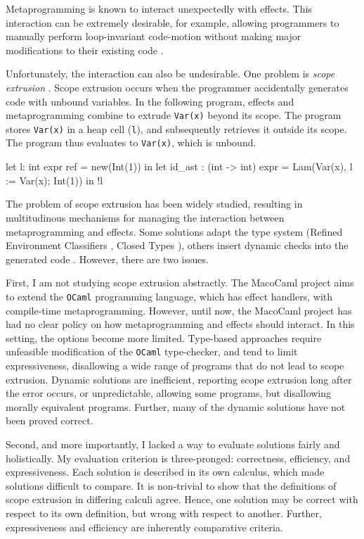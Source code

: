 Metaprogramming is known to interact unexpectedly with effects. This interaction can be extremely desirable, for example, allowing programmers to manually perform loop-invariant code-motion \citep{kiselyov-14} without making major modifications to their existing code \citep{lawall-94}. 

Unfortunately, the interaction can also be undesirable. One problem is \textit{scope extrusion} \citep{kiselyov-14}. Scope extrusion occurs when the programmer accidentally generates code with unbound variables. In the following program, effects and metaprogramming combine to extrude \texttt{Var(x)} beyond its scope. The program stores \texttt{Var(x)} in a heap cell (\texttt{l}), and subsequently retrieves it outside its scope. The program thus evaluates to \texttt{Var(x)}, which is unbound.

\begin{ocaml}
let l: int expr ref = new(Int(1)) in 
let id_ast : (int -> int) expr = Lam(Var(x), l := Var(x); Int(1)) in
!l
\end{ocaml} 

The problem of scope extrusion has been widely studied, resulting in multitudinous mechanisms for managing the interaction between metaprogramming and effects. Some solutions adapt the type system (Refined Environment Classifiers \citep{kiselyov-16,isoda-24}, Closed Types \citep{calcagno-00}), others insert dynamic checks into the generated code \citep{kiselyov-14}. However, there are two issues.

First, I am not studying scope extrusion abstractly. The MacoCaml \citep{xie-2022} project aims to extend the \texttt{OCaml} programming language, which has effect handlers, with compile-time metaprogramming. However, until now, the MacoCaml project has had no clear policy on how metaprogramming and effects should interact. In this setting, the options become more limited. Type-based approaches require unfeasible modification of the \texttt{OCaml} type-checker, and tend to limit expressiveness, disallowing a wide range of programs that do not lead to scope extrusion. Dynamic solutions are inefficient, reporting scope extrusion long after the error occurs, or unpredictable, allowing some programs, but disallowing morally equivalent programs. Further, many of the dynamic solutions have not been proved correct.

Second, and more importantly, I lacked a way to evaluate solutions fairly and holistically. My evaluation criterion is three-pronged: correctness, efficiency, and expressiveness. Each solution is described in its own calculus, which made solutions difficult to compare. It is non-trivial to show that the definitions of scope extrusion in differing calculi agree. Hence, one solution may be correct with respect to its own definition, but wrong with respect to another. Further, expressiveness and efficiency are inherently comparative criteria.

